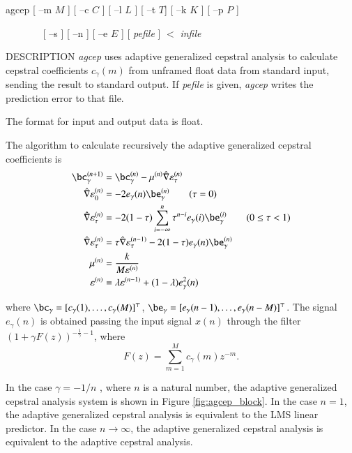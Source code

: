 \begin{synopsis}
\item [agcep] [ --m $M$ ] [ --c $C$ ] [ --l $L$ ] [ --t $T$] [ --k $K$ ]
              [ --p $P$ ]
\item [\ ~~~~~~]  [ --s ] [ --n ] [ --e $E$ ] [ {\em pefile} ] $<$ {\em infile}
\end{synopsis}

\begin{qsection}{DESCRIPTION}
        {\em agcep} uses adaptive generalized cepstral analysis
        \cite{ref:agcep-IEICEtaikai90s}
        to calculate cepstral coefficients $c_\gamma(m)$ 
        from unframed float data from standard input,
        sending the result to standard output. 
        If {\em pefile} is given, 
        {\em agcep} writes the prediction error to that file.

        The format for input and output data is float.

        The algorithm to calculate recursively the
        adaptive generalized cepstral coefficients is 
\begin{align}
  \bc_\gamma^{(n+1)} &= \bc_\gamma^{(n)} 
     - \mu^{(n)} \hat{\nabla} \varepsilon_{\tau}^{(n)} \notag \\
  \hat{\nabla} \varepsilon_{0}^{(n)} &= -2 e_\gamma (n) \be_\gamma^{(n)}
  \qquad ( \tau = 0 ) \notag \\
  \hat{\nabla} \varepsilon_{\tau}^{(n)} &= -2 (1 - \tau) \sum_{i=-\infty}^{n}
  \tau^{n-i} e_\gamma (i) \be_\gamma^{(i)} \qquad ( 0 \le \tau < 1 ) \notag \\
  \hat{\nabla} \varepsilon_{\tau}^{(n)} &= \tau \hat{\nabla}  
  \varepsilon_{\tau}^{(n-1)} - 2 (1 - \tau) e_\gamma (n) \be_\gamma^{(n)}
  \notag \\
  \mu^{(n)} &= \frac{k}{M \varepsilon^{(n)}} \notag \\
  \varepsilon^{(n)} &= \lambda \varepsilon^{(n-1)}
     + (1-\lambda)e_\gamma^2(n) \notag
\end{align}     

where
$\bc_\gamma = [c_\gamma(1),\ldots,c_\gamma(M)]^\top$,
$\be_\gamma = [e_\gamma(n-1),\ldots,e_\gamma(n-M)]^\top$.
The signal $e_\gamma(n)$ is obtained passing the input signal
 $x(n)$ through the filter $(1+\gamma F(z))^{-\frac{1}{\gamma}-1}$,
where 
\begin{displaymath}
F(z) = \sum_{m=1}^{M}c_\gamma(m)z^{-m}.
\end{displaymath}
\par
In the case $\gamma = -1/n$ , where $n$ is a natural number,
the adaptive generalized cepstral analysis system is shown in 
Figure \ref{fig:agcep_block}.
In the case $n=1$, the adaptive generalized cepstral
analysis is equivalent to the LMS linear predictor.
In the case $n \rightarrow \infty$,
the adaptive generalized cepstral
analysis is equivalent to the 
adaptive cepstral analysis.


\end{qsection}
